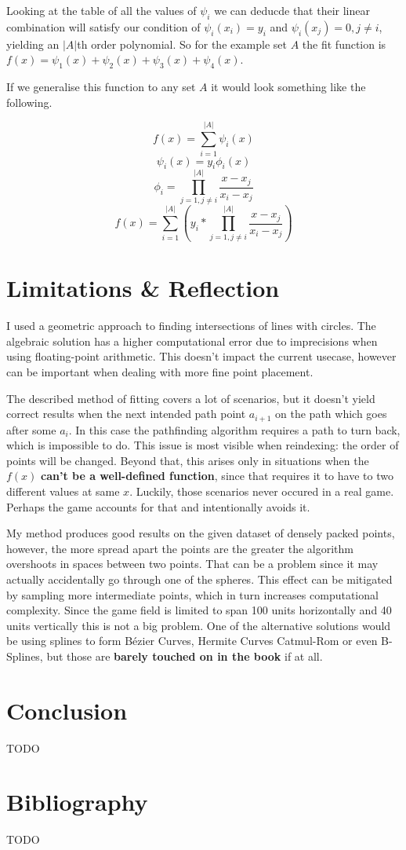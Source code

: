 \documentclass[12pt, titlepage]{article}
\newcommand{\TODO}{\begin{center}\color{red}TODO\end{center}}
\begin{document}
Looking at the table of all the values of $\psi_i$ we can deducde that their linear
combination will satisfy our condition of $\psi_i(x_i) = y_i$ and 
$\psi_i(x_j) = 0, j \neq i$, yielding an $|A|$th order polynomial. 
So for the example set $A$ the fit function is 
$f(x) = \psi_1(x) + \psi_2(x) + \psi_3(x) + \psi_4(x)$.

If we generalise this function to any set $A$ it would look something 
like the following.

$$f(x) = \sum_{i=1}^{|A|}\psi_i(x)$$
$$\psi_i(x) = y_i \phi_i(x)$$
\begin{equation}
    \phi_i = \prod_{j=1, j \neq i}^{|A|}\frac{x - x_j}{x_i - x_j}
\end{equation}
\begin{equation}
f(x) = \sum_{i=1}^{|A|} \left(y_i * \prod_{j=1, j \neq i}^{|A|} \frac{x - x_j}{x_i - x_j}\right)
\end{equation}

\section{Limitations \& Reflection}
I used a geometric approach to finding intersections of lines with circles.
The algebraic solution has a higher computational error due to imprecisions 
when using floating-point arithmetic. This doesn't impact the current usecase,
however can be important when dealing with more fine point placement.

The described method of fitting covers a lot of scenarios, but it doesn't yield 
correct results
when the next intended path point $a_{i + 1}$ on the path which goes after 
some $a_i$. In this case the pathfinding algorithm requires a path to turn back,
which is impossible to do. This issue is most visible when reindexing: the order
of points will be changed. Beyond that, this arises only in situations when the 
$f(x)$ \textbf{can't be a well-defined function}, since that requires it to have to
two different values at same $x$. Luckily, those scenarios never occured in a 
real game. Perhaps the game accounts for that and intentionally avoids it.

My method produces good results on the given dataset of densely packed points,
however, the more spread apart the points are the greater the algorithm
overshoots in spaces between two points. That can be a problem since it may 
actually accidentally go through one of the spheres. This effect can be
mitigated by sampling more intermediate points, which in turn increases 
computational complexity. Since the game field is  limited to span 100 units
horizontally and 40 units vertically this is not a big problem. One of the
alternative solutions would be using splines to form B\'{e}zier Curves, 
Hermite Curves Catmul-Rom or even B-Splines, but those are \textbf{barely touched 
on in the book} if at all.

\section{Conclusion}
\TODO

\section{Bibliography}
\appendix
\TODO
\end{document}
